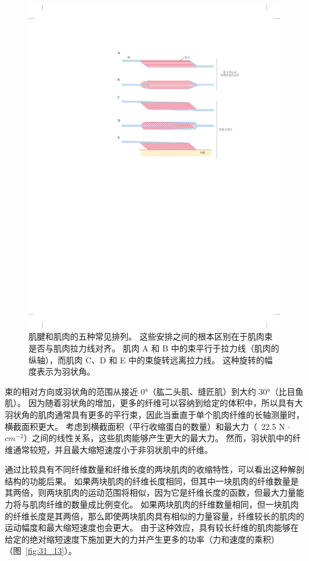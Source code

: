\begin{figure}[htbp]
	\centering
	\includegraphics[width=0.87\linewidth]{chap31/fig_31_12}
	\caption{肌腱和肌肉的五种常见排列。
	这些安排之间的根本区别在于肌肉束是否与肌肉拉力线对齐。
	肌肉 A 和 B 中的束平行于拉力线（肌肉的纵轴），而肌肉 C、D 和 E 中的束旋转远离拉力线。
	这种旋转的幅度表示为羽状角\cite{winters2012multiple}。}
	\label{fig:31_12}
\end{figure}


束的相对方向或羽状角的范围从接近 0°（肱二头肌、缝匠肌）到大约 30°（比目鱼肌）。
因为随着羽状角的增加，更多的纤维可以容纳到给定的体积中，所以具有大羽状角的肌肉通常具有更多的平行束，因此当垂直于单个肌肉纤维的长轴测量时，横截面积更大。
考虑到横截面积（平行收缩蛋白的数量）和最大力（~22.5 N $\cdot$ $ cm^{-2} $）之间的线性关系，这些肌肉能够产生更大的最大力。
然而，羽状肌中的纤维通常较短，并且最大缩短速度小于非羽状肌中的纤维。


通过比较具有不同纤维数量和纤维长度的两块肌肉的收缩特性，可以看出这种解剖结构的功能后果。
如果两块肌肉的纤维长度相同，但其中一块肌肉的纤维数量是其两倍，则两块肌肉的运动范围将相似，因为它是纤维长度的函数，但最大力量能力将与肌肉纤维的数量成比例变化。
如果两块肌肉的纤维数量相同，但一块肌肉的纤维长度是其两倍，那么即使两块肌肉具有相似的力量容量，纤维较长的肌肉的运动幅度和最大缩短速度也会更大。
由于这种效应，具有较长纤维的肌肉能够在给定的绝对缩短速度下施加更大的力并产生更多的功率（力和速度的乘积）（图~\ref{fig:31_13}）。


